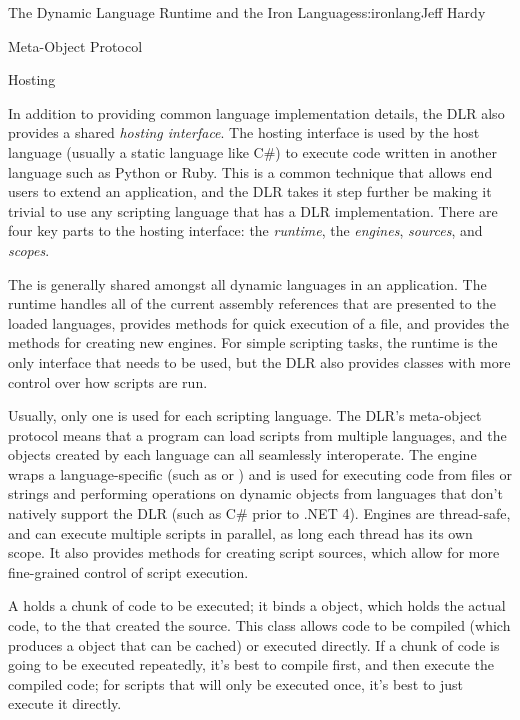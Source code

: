 \begin{aosachapter}{The Dynamic Language Runtime and the Iron Languages}{s:ironlang}{Jeff Hardy}
\begin{aosasect1}{Meta-Object Protocol}
\end{aosasect1}

\begin{aosasect1}{Hosting}

In addition to providing common language implementation details, the
DLR also provides a shared \emph{hosting interface}. The hosting
interface is used by the host language (usually a static language like
C\#) to execute code written in another language such as Python or
Ruby. This is a common technique that allows end users to extend an
application, and the DLR takes it step further be making it trivial to
use any scripting language that has a DLR implementation. There are
four key parts to the hosting interface: the \emph{runtime}, the
\emph{engines}, \emph{sources}, and \emph{scopes}.

The  is generally shared amongst all dynamic
languages in an application. The runtime handles all of the current
assembly references that are presented to the loaded languages,
provides methods for quick execution of a file, and provides the
methods for creating new engines. For simple scripting tasks, the
runtime is the only interface that needs to be used, but the DLR also
provides classes with more control over how scripts are run.

Usually, only one  is used for each scripting
language. The DLR's meta-object protocol means that a program can load
scripts from multiple languages, and the objects created by each
language can all seamlessly interoperate. The engine wraps a
language-specific  (such as 
or ) and is used for executing code from files or
strings and performing operations on dynamic objects from languages
that don't natively support the DLR (such as C\# prior to .NET 4).
Engines are thread-safe, and can execute multiple scripts in parallel,
as long each thread has its own scope. It also provides methods for
creating script sources, which allow for more fine-grained control of
script execution.

A  holds a chunk of code to be executed; it binds a
 object, which holds the actual code, to the
 that created the source. This class allows code to
be compiled (which produces a  object that can be
cached) or executed directly. If a chunk of code is going to be
executed repeatedly, it's best to compile first, and then execute the
compiled code; for scripts that will only be executed once, it's best
to just execute it directly.


\end{aosasect1}
\end{aosachapter}
